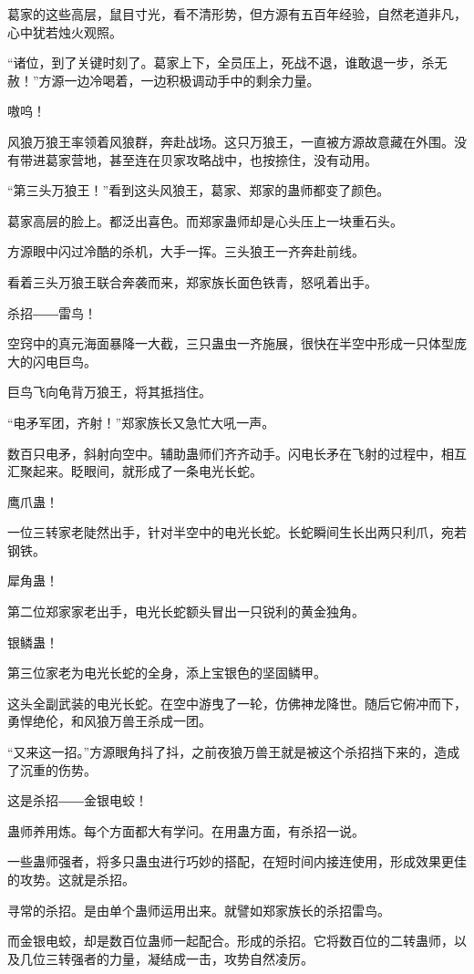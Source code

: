 \begin{this_body}
葛家的这些高层，鼠目寸光，看不清形势，但方源有五百年经验，自然老道非凡，心中犹若烛火观照。

“诸位，到了关键时刻了。葛家上下，全员压上，死战不退，谁敢退一步，杀无赦！”方源一边冷喝着，一边积极调动手中的剩余力量。

嗷呜！

风狼万狼王率领着风狼群，奔赴战场。这只万狼王，一直被方源故意藏在外围。没有带进葛家营地，甚至连在贝家攻略战中，也按捺住，没有动用。

“第三头万狼王！”看到这头风狼王，葛家、郑家的蛊师都变了颜色。

葛家高层的脸上。都泛出喜色。而郑家蛊师却是心头压上一块重石头。

方源眼中闪过冷酷的杀机，大手一挥。三头狼王一齐奔赴前线。

看着三头万狼王联合奔袭而来，郑家族长面色铁青，怒吼着出手。

杀招――雷鸟！

空窍中的真元海面暴降一大截，三只蛊虫一齐施展，很快在半空中形成一只体型庞大的闪电巨鸟。

巨鸟飞向龟背万狼王，将其抵挡住。

“电矛军团，齐射！”郑家族长又急忙大吼一声。

数百只电矛，斜射向空中。辅助蛊师们齐齐动手。闪电长矛在飞射的过程中，相互汇聚起来。眨眼间，就形成了一条电光长蛇。

鹰爪蛊！

一位三转家老陡然出手，针对半空中的电光长蛇。长蛇瞬间生长出两只利爪，宛若钢铁。

犀角蛊！

第二位郑家家老出手，电光长蛇额头冒出一只锐利的黄金独角。

银鳞蛊！

第三位家老为电光长蛇的全身，添上宝银色的坚固鳞甲。

这头全副武装的电光长蛇。在空中游曳了一轮，仿佛神龙降世。随后它俯冲而下，勇悍绝伦，和风狼万兽王杀成一团。

“又来这一招。”方源眼角抖了抖，之前夜狼万兽王就是被这个杀招挡下来的，造成了沉重的伤势。

这是杀招――金银电蛟！

蛊师养用炼。每个方面都大有学问。在用蛊方面，有杀招一说。

一些蛊师强者，将多只蛊虫进行巧妙的搭配，在短时间内接连使用，形成效果更佳的攻势。这就是杀招。

寻常的杀招。是由单个蛊师运用出来。就譬如郑家族长的杀招雷鸟。

而金银电蛟，却是数百位蛊师一起配合。形成的杀招。它将数百位的二转蛊师，以及几位三转强者的力量，凝结成一击，攻势自然凌厉。


\end{this_body}
